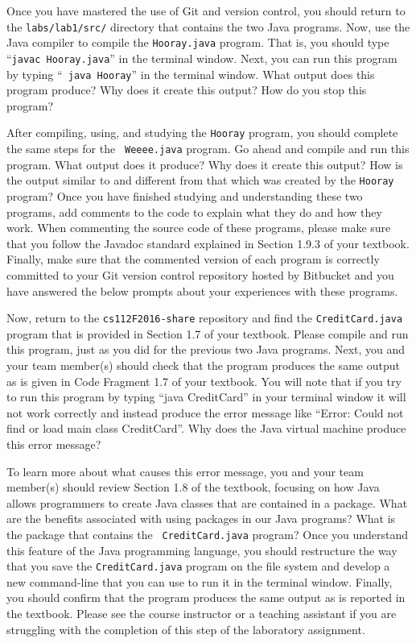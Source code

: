 Once you have mastered the use of Git and version control, you should return to the {\tt labs/lab1/src/} directory
that contains the two Java programs. Now, use the Java compiler to compile the {\tt Hooray.java} program.  That is,
you should type ``{\tt javac Hooray.java}'' in the terminal window.  Next, you can run this program by typing ``{\tt
java Hooray}'' in the terminal window.  What output does this program produce?  Why does it create this output? How
do you stop this program?

After compiling, using, and studying the {\tt Hooray} program, you should complete the same steps for the {\tt
Weeee.java} program. Go ahead and compile and run this program. What output does it produce? Why does it create this
output? How is the output similar to and different from that which was created by the {\tt Hooray} program? Once you
have finished studying and understanding these two programs, add comments to the code to explain what they do and how
they work. When commenting the source code of these programs, please make sure that you follow the Javadoc standard
explained in Section 1.9.3 of your textbook. Finally, make sure that the commented version of each program is correctly
committed to your Git version control repository hosted by Bitbucket and you have answered the below prompts about your
experiences with these programs.

Now, return to the {\tt cs112F2016-share} repository and find the {\tt CreditCard.java} program that is provided in
Section 1.7 of your textbook. Please compile and run this program, just as you did for the previous two Java programs.
Next, you and your team member(s) should check that the program produces the same output as is given in Code Fragment
1.7 of your textbook. You will note that if you try to run this program by typing ``java CreditCard'' in your terminal
window it will not work correctly and instead produce the error message like ``Error: Could not find or load main class
CreditCard''. Why does the Java virtual machine produce this error message?

To learn more about what causes this error message, you and your team member(s) should review Section 1.8 of the
textbook, focusing on how Java allows programmers to create Java classes that are contained in a package. What are the
benefits associated with using packages in our Java programs? What is the package that contains the {\tt
CreditCard.java} program? Once you understand this feature of the Java programming language, you should restructure the
way that you save the {\tt CreditCard.java} program on the file system and develop a new command-line that you can use
to run it in the terminal window. Finally, you should confirm that the program produces the same output as is reported
in the textbook. Please see the course instructor or a teaching assistant if you are struggling with the completion of
this step of the laboratory assignment.

